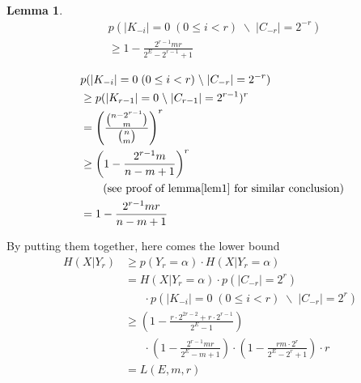\documentclass[10pt, conference, compsocconf]{IEEEtran}
\newtheorem{mylemma}{Lemma}
\begin{document}
        \begin{mylemma}
            \begin{align*}
            &p(|K_{-i}| = 0    \; (0 \leq i < r) \; \backslash \; |C_{-r}| = 2^{-r}) \\
                &\geq 1-\frac{2^{r-1}mr}{2^E-2^{r-1}+1}
            \end{align*}
        \end{mylemma}

        \begin{IEEEproof}
            \begin{align*}
                &p(|K_{-i}| = 0    \; (0 \leq i < r) \; \backslash \; |C_{-r}| = 2^{-r}) \\\
                    &\geq p(|K_{r-1}| = 0 \; \backslash \; |C_{r-1}| = 2^{r-1})^r\\
                    &= \left(\frac{\binom{n-2^{r-1}}{m}}{\binom{n}{m}} \right)^r\\
                    &\geq \left(1-\frac{2^{r-1}m}{n-m+1}\right)^r   \; \\
                    & \;\;\;\;\;\; \text{ (see proof of lemma\ref{lem1} for similar conclusion})\\
                    &= 1-\frac{2^{r-1}m r}{n-m+1}
            \end{align*}
        \end{IEEEproof}

        By putting them together, here comes the lower bound
        \begin{align*}
            H(X | Y_r) &\geq p(Y_r = \alpha) \cdot H(X | Y_r = \alpha)\\
                &= H(X | Y_r = \alpha) \cdot p(|C_{-r}| = 2^r) \\
                    &\;\;\;\;\;\; \cdot p(|K_{-i}| = 0 \; (0 \leq i < r) \; \backslash \; |C_{-r}| = 2^r) \\
                &\geq (1-\frac{r \cdot 2^{2r-2}+r \cdot 2^{r-1}}{2^E-1})\\
                    &\;\;\;\;\;\; \cdot (1-\frac{2^{r-1}m r}{2^E-m+1})
                    \cdot (1-\frac{r m \cdot 2^r}{2^E-2^r+1}) \cdot r \\
                &= L(E, m, r)
        \end{align*}
\end{document}
